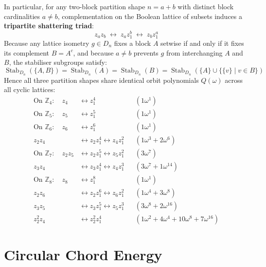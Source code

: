 In particular, for any two-block partition shape $n = a + b$ with distinct block cardinalities $a \ne b$, complementation on the Boolean lattice of subsets induces a \textbf{tripartite shattering triad}:
\begin{equation}
z_a z_b \;\longleftrightarrow\; z_a z_1^b \;\longleftrightarrow\; z_b z_1^a
\end{equation}
Because any lattice isometry $g \in D_n$ fixes a block $A$ setwise if and only if it fixes its complement $B = A^c$, and because $a \ne b$ prevents $g$ from interchanging $A$ and $B$, the stabiliser subgroups satisfy:
\begin{equation}
\operatorname{Stab}_{D_n}(\{A, B\}) = \operatorname{Stab}_{D_n}(A) = \operatorname{Stab}_{D_n}(B) = \operatorname{Stab}_{D_n}(\{A\} \cup \{\{v\} \mid v \in B\})
\end{equation}
Hence all three partition shapes share identical orbit polynomials $Q(\omega)$ across all cyclic lattices:
\begin{align}
\text{On } \mathbb{Z}_4\colon \quad z_4 &\longleftrightarrow z_1^4 && (1\omega^1) \\
\text{On } \mathbb{Z}_5\colon \quad z_5 &\longleftrightarrow z_1^5 && (1\omega^1) \\
\text{On } \mathbb{Z}_6\colon \quad z_6 &\longleftrightarrow z_1^6 && (1\omega^1) \\
z_2 z_4 &\longleftrightarrow z_2 z_1^4 \longleftrightarrow z_4 z_1^2 && (1\omega^3 + 2\omega^6) \\
\text{On } \mathbb{Z}_7\colon \quad z_2 z_5 &\longleftrightarrow z_2 z_1^5 \longleftrightarrow z_5 z_1^2 && (3\omega^7) \\
z_3 z_4 &\longleftrightarrow z_3 z_1^4 \longleftrightarrow z_4 z_1^3 && (3\omega^7 + 1\omega^{14}) \\
\text{On } \mathbb{Z}_8\colon \quad z_8 &\longleftrightarrow z_1^8 && (1\omega^1) \\
z_2 z_6 &\longleftrightarrow z_2 z_1^6 \longleftrightarrow z_6 z_1^2 && (1\omega^4 + 3\omega^8) \\
z_3 z_5 &\longleftrightarrow z_3 z_1^5 \longleftrightarrow z_5 z_1^3 && (3\omega^8 + 2\omega^{16}) \\
z_2^2 z_4 &\longleftrightarrow z_2^2 z_1^4 && (1\omega^2 + 4\omega^4 + 10\omega^8 + 7\omega^{16})
\end{align}

\section{Circular Chord Energy}

